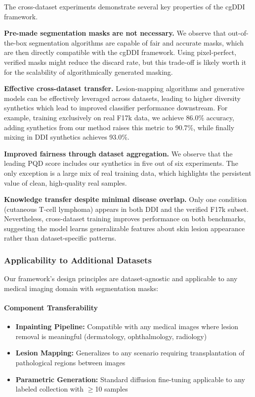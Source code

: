 \documentclass[11pt]{ucthesis}
\begin{document}
The cross-dataset experiments demonstrate several key properties of the cgDDI framework.

\textbf{Pre-made segmentation masks are not necessary.} We observe that out-of-the-box segmentation algorithms are capable of fair and accurate masks, which are then directly compatible with the cgDDI framework. Using pixel-perfect, verified masks might reduce the discard rate, but this trade-off is likely worth it for the scalability of algorithmically generated masking.

\textbf{Effective cross-dataset transfer.} Lesion-mapping algorithms and generative models can be effectively leveraged across datasets, leading to higher diversity synthetics which lead to improved classifier performance downstream. For example, training exclusively on real F17k data, we achieve 86.0\% accuracy, adding synthetics from our method raises this metric to 90.7\%, while finally mixing in DDI synthetics achieves 93.0\%.

\textbf{Improved fairness through dataset aggregation.} We observe that the leading PQD score includes our synthetics in five out of six experiments. The only exception is a large mix of real training data, which highlights the persistent value of clean, high-quality real samples. 

\textbf{Knowledge transfer despite minimal disease overlap.} Only one condition (cutaneous T-cell lymphoma) appears in both DDI and the verified F17k subset. Nevertheless, cross-dataset training improves performance on both benchmarks, suggesting the model learns generalizable features about skin lesion appearance rather than dataset-specific patterns.


\subsubsection{Applicability to Additional Datasets}

\label{cgddi:sec:generalization}

Our framework's design principles are dataset-agnostic and applicable to any medical imaging domain with segmentation masks:

\paragraph{Component Transferability}
\begin{itemize}
    \item \textbf{Inpainting Pipeline:} Compatible with any medical images where lesion removal is meaningful (dermatology, ophthalmology, radiology)
    \item \textbf{Lesion Mapping:} Generalizes to any scenario requiring transplantation of pathological regions between images
    \item \textbf{Parametric Generation:} Standard diffusion fine-tuning applicable to any labeled collection with $\geq$10 samples
\end{itemize}
\end{document}
